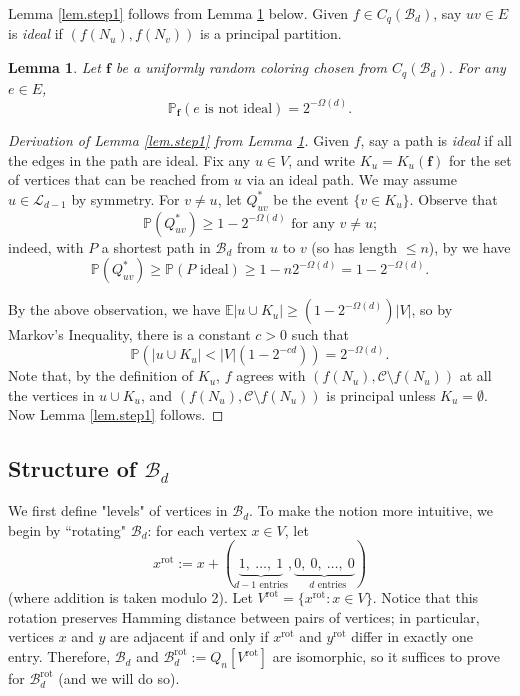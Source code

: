 \documentclass{amsart}
\newtheorem{lem}[thm]{Lemma}
\theoremstyle{definition}
\newcommand{\gO}{\Omega}
\newcommand{\cB}{\mathcal{B} }
\newcommand{\cC}{\mathcal{C} }
\newcommand{\cL}{\mathcal{L} }
\newcommand{\bbf}{\mathbf{f}}
\newcommand{\beq}[1]{\begin{equation}\label{#1}}
\newcommand{\enq}[0]{\end{equation}}
\newcommand{\nin}[0]{\noindent}
\newcommand{\0}[0]{\emptyset}
\newcommand{\pr}[0]{\mathbb{P}}
\newcommand{\rot}[0]{\text{rot}}
\begin{document}
	Lemma \ref{lem.step1} follows from Lemma \ref{lem.step1'} below. Given $f \in C_q(\cB_d)$, say $uv \in E$ is \textit{ideal} if $(f(N_u), f(N_v))$ is a principal partition. 
	
	\begin{lem}\label{lem.step1'} 
	Let $\bbf$ be a uniformly random coloring chosen from $C_q(\cB_d)$.
	For any $e \in E$,
		\beq{eq.lem3.1}\pr_\bbf(\mbox{$e$ is not ideal})=2^{-\gO(d)}.\enq
	\end{lem}


	\begin{proof}[Derivation of Lemma \ref{lem.step1} from Lemma \ref{lem.step1'}]
		
		
		
		Given $f$, say a path is \textit{ideal} if all the edges in the path are ideal. Fix any $u \in V$, and write $K_u=K_u(\bbf)$ for the set of vertices that can be reached from $u$ via an ideal path. We may assume $u \in \cL_{d-1}$ by symmetry. 
For $v \ne u$, let $Q^*_{uv}$ be the event $\{v \in K_u\}$. Observe that
			\[\pr(Q^*_{uv}) \ge 1-2^{-\gO(d)} \mbox{ for any $v \ne u$;}\]
\nin indeed, with $P$ a shortest path in $\cB_d$ from $u$ to $v$ (so has length $\le n$), by  we have
			\[\pr(Q^*_{uv}) \ge \pr(\mbox{$P$ ideal})\ge 1-n2^{-\gO(d)}=1-2^{-\gO(d)}.\]

		By the above observation, we have $\mathbb E| u \cup K_u|\ge (1-2^{-\gO(d)})|V|$, so by Markov's Inequality, there is a constant $c>0$ such that
		\[\pr(|u \cup K_u|<|V|(1-2^{-cd}))=2^{-\gO(d)}.\]
Note that, by the definition of $K_u$, $f$ agrees with $(f(N_u), \cC \setminus f(N_u))$ at all the vertices in $u \cup K_u$, and $(f(N_u), \cC \setminus f(N_u))$ is principal unless $K_u =\emptyset$. Now Lemma \ref{lem.step1} follows.\end{proof}
	


\subsection{Structure of $\cB_d$}\label{subsec.rotation}
	
	We first define "levels" of vertices in $\cB_d$. 
		To make the notion more intuitive, we begin by ``rotating" $\cB_d$: for each vertex $x\in V$, let $$x^\rot := x + (\underbrace{1,\ \dots,\  1}_{\text{$d-1$ entries}}, \underbrace{0,\ 0,\ \dots,\ 0}_{\text{ $d$ entries}})$$ 
	(where addition is taken modulo 2). Let $V^\rot=\{x^\rot:x \in V\}$. Notice that this rotation preserves Hamming distance between pairs of vertices; in particular, vertices $x$ and $y$ are adjacent if and only if $x^{\rot}$ and $y^{\rot}$ differ in exactly one entry. Therefore, $\cB_d$ and $\cB_d^\rot:=Q_n[V^\rot]$ are isomorphic, so it suffices to prove  for $\cB_d^\rot$ (and we will do so).
\end{document}

